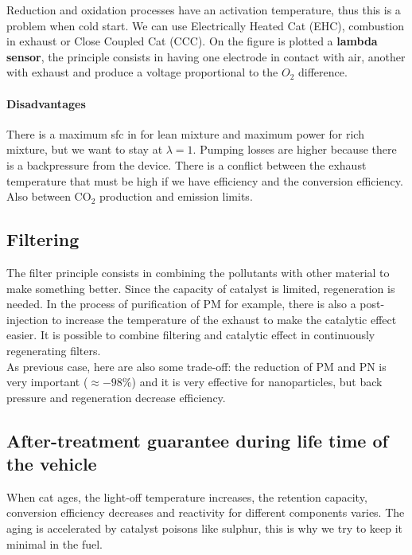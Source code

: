    Reduction and oxidation processes have an activation temperature, thus this is a problem when cold start. We can use Electrically Heated Cat (EHC), combustion in exhaust or Close Coupled Cat (CCC). On the figure is plotted a \textbf{lambda sensor}, the principle consists in having one electrode in contact with air, another with exhaust and produce a voltage proportional to the $O_2$ difference. 
   
\paragraph{Disadvantages}
	There is a maximum sfc in for lean mixture and maximum power for rich mixture, but we want to stay at $\lambda = 1$. Pumping losses are higher because there is a backpressure from the device. There is a conflict between the exhaust temperature that must be high if we have efficiency and the conversion efficiency. Also between CO$_2$ production and emission limits. 
	
\subsection{Filtering}
	
	The filter principle consists in combining the pollutants with other material to make something better. Since the capacity of catalyst is limited, regeneration is needed. In the process of purification of PM for example, there is also a post-injection to increase the temperature of the exhaust to make the catalytic effect easier. It is possible to combine filtering and catalytic effect in continuously regenerating filters. \\
	
	As previous case, here are also some trade-off: the reduction of PM and PN is very important ($\approx - 98\%$) and it is very effective for nanoparticles, but back pressure and regeneration decrease efficiency. 
	
\subsection{After-treatment guarantee during life time of the vehicle}
	When cat ages, the light-off temperature increases, the retention capacity, conversion efficiency decreases and reactivity for different components varies. The aging is accelerated by catalyst poisons like sulphur, this is why we try to keep it minimal in the fuel. 